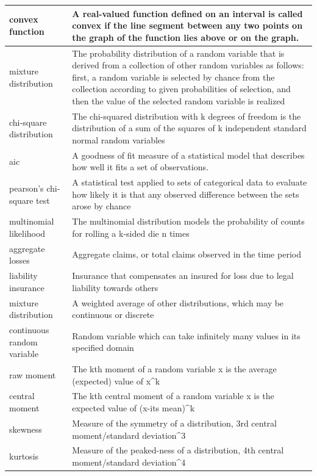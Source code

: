 \documentclass[
]{book}
\begin{document}
\begin{longtable}{>{\raggedright\arraybackslash}p{10em}|>{\raggedright\arraybackslash}p{30em}}
\hline
convex function & A real-valued function defined on an interval is called convex if the line segment between any two points on the graph of the function lies above or on the graph.\\
\hline
mixture distribution & The probability distribution of a random variable that is derived from a collection of other random variables as follows: first, a random variable is selected by chance from the collection according to given probabilities of selection, and then the value of the selected random variable is realized\\
\hline
chi-square distribution & The chi-squared distribution with k degrees of freedom is the distribution of a sum of the squares of k independent standard normal random variables\\
\hline
aic & A goodness of fit measure of a statistical model that describes how well it fits a set of observations.\\
\hline
pearson's chi-square test & A statistical test applied to sets of categorical data to evaluate how likely it is that any observed difference between the sets arose by chance\\
\hline
multinomial likelihood & The multinomial distribution models the probability of counts for rolling a k-sided die n times\\
\hline
aggregate losses & Aggregate claims, or total claims observed in the time period\\
\hline
liability insurance & Insurance that compensates an insured for loss due to legal liability towards others\\
\hline
mixture distribution & A weighted average of other distributions, which may be continuous or discrete\\
\hline
continuous random variable & Random variable which can take infinitely many values in its specified domain\\
\hline
raw moment & The kth moment of a random variable x is the average (expected) value of x\textasciicircum{}k\\
\hline
central moment & The kth central moment of a random variable x is the expected value of (x-its mean)\textasciicircum{}k\\
\hline
skewness & Measure of the symmetry of a distribution, 3rd central moment/standard deviation\textasciicircum{}3\\
\hline
kurtosis & Measure of the peaked-ness of a distribution, 4th central moment/standard deviation\textasciicircum{}4\\

\end{longtable}
\end{document}
